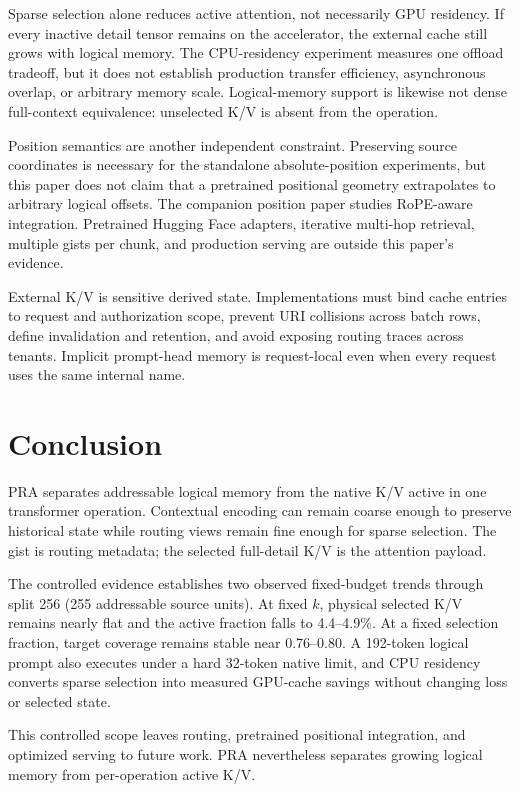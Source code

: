 \documentclass[11pt]{article}
\begin{document}
Sparse selection alone reduces active attention, not necessarily GPU residency.
If every inactive detail tensor remains on the accelerator,
the external cache still grows with logical memory.
The CPU-residency experiment measures one offload tradeoff,
but it does not establish production transfer efficiency, asynchronous overlap,
or arbitrary memory scale. Logical-memory support is likewise not dense full-context
equivalence: unselected K/V is absent from the operation.

Position semantics are another independent constraint.
Preserving source coordinates is necessary for the standalone absolute-position
experiments, but this paper does not claim that a pretrained positional geometry
extrapolates to arbitrary logical offsets. The companion position paper studies
RoPE-aware integration. Pretrained Hugging Face adapters, iterative multi-hop retrieval,
multiple gists per chunk, and production serving are outside this paper's evidence.

External K/V is sensitive derived state. Implementations must bind cache entries to
request and authorization scope, prevent URI collisions across batch rows,
define invalidation and retention, and avoid exposing routing traces across tenants.
Implicit prompt-head memory is request-local even when every request uses the same
internal name.

\section{Conclusion}
\label{sec:concl}

PRA separates addressable logical memory from the native K/V active in one transformer
operation. Contextual encoding can remain coarse enough to preserve historical state
while routing views remain fine enough for sparse selection.
The gist is routing metadata; the selected full-detail K/V is the attention payload.

The controlled evidence establishes two observed fixed-budget trends through split 256
(255 addressable source units). At fixed $k$, physical selected K/V remains nearly flat
and the active fraction falls to 4.4--4.9\%. At a fixed selection fraction,
target coverage remains stable near 0.76--0.80. A 192-token logical prompt also executes
under a hard 32-token native limit, and CPU residency converts sparse selection into
measured GPU-cache savings without changing loss or selected state.

This controlled scope leaves routing, pretrained positional integration,
and optimized serving to future work. PRA nevertheless separates growing logical memory
from per-operation active K/V.
\end{document}
